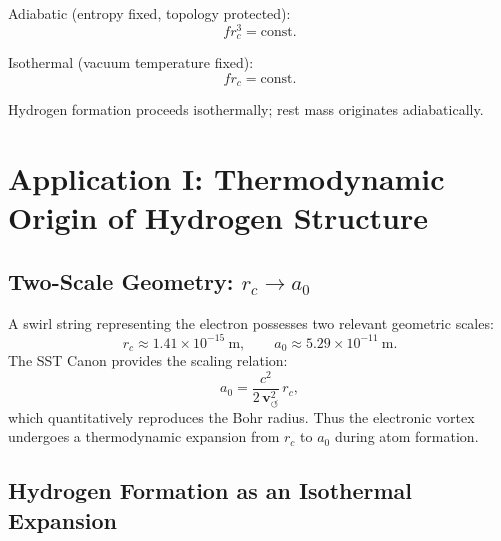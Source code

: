 \documentclass[11pt]{article}
\newcommand{\rc}{r_c}                                    %
\begin{document}
            Adiabatic (entropy fixed, topology protected):
            \begin{equation}
                f \rc^3 = \mathrm{const}.
            \end{equation}

            Isothermal (vacuum temperature fixed):
            \begin{equation}
                f \rc = \mathrm{const}.
            \end{equation}

            Hydrogen formation proceeds isothermally; rest mass originates adiabatically.


    \section{Application I: Thermodynamic Origin of Hydrogen Structure}

        \subsection{Two-Scale Geometry: $\rc \rightarrow a_0$}

            A swirl string representing the electron possesses two relevant geometric scales:
            \begin{equation}
                \rc \approx 1.41 \times 10^{-15}\ \mathrm{m}, \qquad
                a_0 \approx 5.29 \times 10^{-11}\ \mathrm{m}.
            \end{equation}
            The SST Canon provides the scaling relation:
            \begin{equation}
                a_0 = \frac{c^2}{2\,\mathbf{v}_{\scriptscriptstyle\boldsymbol{\circlearrowleft}}^2}\, \rc,
            \end{equation}
            which quantitatively reproduces the Bohr radius.
            Thus the electronic vortex undergoes a thermodynamic expansion from
            $\rc$ to $a_0$ during atom formation.

        \subsection{Hydrogen Formation as an Isothermal Expansion}
\end{document}
